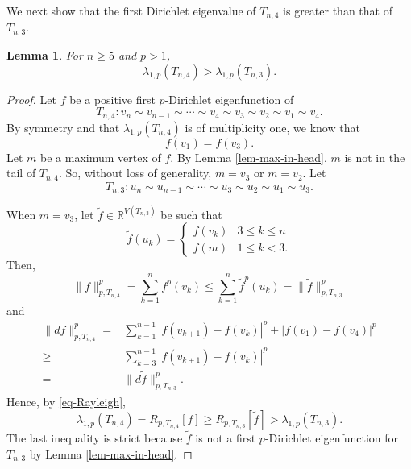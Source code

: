 \documentclass[12pt]{amsart}
\def\R{\mathbb{R}}
\def\wt{\widetilde}
\newtheorem{lem}{Lemma}[section]
\theoremstyle{definition}
\theoremstyle{remark}
\numberwithin{equation}{section}
\begin{document}
We next show that the first Dirichlet eigenvalue of $T_{n,4}$ is greater than that of $T_{n,3}$.
\begin{lem}\label{lem-comparison-tadpole}
For $n\geq 5$ and $p>1$,
$$\lambda_{1,p}(T_{n,4})>\lambda_{1,p}(T_{n,3}).$$
\end{lem}
\begin{proof}
Let $f$ be a positive first $p$-Dirichlet eigenfunction of
$$T_{n,4}: v_n\sim v_{n-1}\sim \cdots\sim v_4\sim v_3\sim v_2\sim v_1\sim v_4.$$
By symmetry and that $\lambda_{1,p}(T_{n,4})$ is of multiplicity one, we know that
\begin{equation}\label{eq-f-v1=v3}
f(v_1)=f(v_3).
\end{equation}
Let $m$ be a maximum vertex of $f$. By Lemma \ref{lem-max-in-head}, $m$ is not in the tail of $T_{n,4}$. So, without loss of generality, $m=v_3$ or $m=v_2$. Let
$$T_{n,3}: u_n\sim u_{n-1}\sim\cdots\sim u_{3}\sim u_2\sim u_1\sim u_3.$$

When $m=v_3$, let $\wt f\in \R^{V(T_{n,3})}$ be such that
\begin{equation*}
\wt f(u_k)=\left\{\begin{array}{ll}f(v_k)&3\leq k\leq n\\
f(m)&1\leq k<3.
\end{array}\right.
\end{equation*}
Then,
\begin{equation*}
\|f\|_{p,T_{n,4}}^p=\sum_{k=1}^nf^p(v_k)\leq \sum_{k=1}^n\wt f^p(u_k)=\|\wt f\|_{p,T_{n,3}}^p
\end{equation*}
and
\begin{equation*}
\begin{split}
\|df\|_{p,T_{n,4}}^p=&\sum_{k=1}^{n-1}|f(v_{k+1})-f(v_k)|^p+|f(v_1)-f(v_4)|^p\\
\geq&\sum_{k=3}^{n-1}|f(v_{k+1})-f(v_k)|^p\\
=&\|d\wt f\|_{p,T_{n,3}}^p.
\end{split}
\end{equation*}
Hence, by \eqref{eq-Rayleigh},
$$\lambda_{1,p}(T_{n,4})=R_{p,T_{n,4}}[f]\geq R_{p,T_{n,3}}[\wt f]>\lambda_{1,p}(T_{n,3}).$$
The last inequality is strict because $\wt f$ is not a first $p$-Dirichlet eigenfunction for $T_{n,3}$ by Lemma \ref{lem-max-in-head}.


\end{proof}
\end{document}
